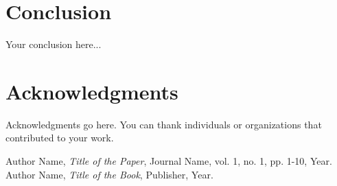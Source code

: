\documentclass{site-conf}
\begin{document}
\section{Conclusion}
Your conclusion here...

\section{Acknowledgments}
Acknowledgments go here. You can thank individuals or organizations
that contributed to your work.

\begin{thebibliography}{99}
  Author Name, \emph{Title of the Paper}, Journal Name, vol. 1, no.
  1, pp. 1-10, Year.
  Author Name, \emph{Title of the Book}, Publisher, Year.
\end{thebibliography}
\end{document}

